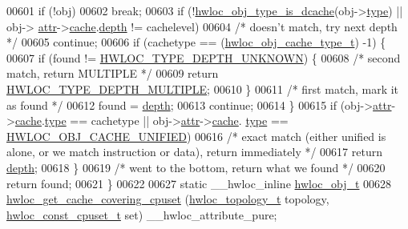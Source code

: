 \begin{DoxyCode}
00601     \textcolor{keywordflow}{if} (!obj)
00602       \textcolor{keywordflow}{break};
00603     \textcolor{keywordflow}{if} (!\hyperlink{a00198_ga395e48cd221d107e5891689624e1aec4}{hwloc\_obj\_type\_is\_dcache}(obj->\hyperlink{a00238_acc4f0803f244867e68fe0036800be5de}{type}) || obj->
      \hyperlink{a00238_accd40e29f71f19e88db62ea3df02adc8}{attr}->\hyperlink{a00242_ab5a8ae3bf490e6b1071fea53f7382836}{cache}.\hyperlink{a00254_a5c8f7f39193736c2187ed626940835d5}{depth} != cachelevel)
00604       \textcolor{comment}{/* doesn't match, try next depth */}
00605       \textcolor{keywordflow}{continue};
00606     \textcolor{keywordflow}{if} (cachetype == (\hyperlink{a00184_gab6e1e7efedae8b341f3ee14fbe53d66c}{hwloc\_obj\_cache\_type\_t}) -1) \{
00607       \textcolor{keywordflow}{if} (found != \hyperlink{a00187_ggaf4e663cf42bbe20756b849c6293ef575a0565ab92ab72cb0cec91e23003294aad}{HWLOC\_TYPE\_DEPTH\_UNKNOWN}) \{
00608         \textcolor{comment}{/* second match, return MULTIPLE */}
00609         \textcolor{keywordflow}{return} \hyperlink{a00187_ggaf4e663cf42bbe20756b849c6293ef575ae99465995cacde6c210d5fc2e409798c}{HWLOC\_TYPE\_DEPTH\_MULTIPLE};
00610       \}
00611       \textcolor{comment}{/* first match, mark it as found */}
00612       found = \hyperlink{a00238_a4876fd165b4fff35521f07ebd85355ed}{depth};
00613       \textcolor{keywordflow}{continue};
00614     \}
00615     \textcolor{keywordflow}{if} (obj->\hyperlink{a00238_accd40e29f71f19e88db62ea3df02adc8}{attr}->\hyperlink{a00242_ab5a8ae3bf490e6b1071fea53f7382836}{cache}.\hyperlink{a00254_ad8edc8ded2b7a70d6abbc874801930f4}{type} == cachetype || obj->\hyperlink{a00238_accd40e29f71f19e88db62ea3df02adc8}{attr}->\hyperlink{a00242_ab5a8ae3bf490e6b1071fea53f7382836}{cache}.
      \hyperlink{a00254_ad8edc8ded2b7a70d6abbc874801930f4}{type} == \hyperlink{a00184_gga791c9875c8fe20f3e1e5871e0657e59ba3900b3b2db54941aac249e5a638a2d7a}{HWLOC\_OBJ\_CACHE\_UNIFIED})
00616       \textcolor{comment}{/* exact match (either unified is alone, or we match instruction or data), return immediately */}
00617       \textcolor{keywordflow}{return} \hyperlink{a00238_a4876fd165b4fff35521f07ebd85355ed}{depth};
00618   \}
00619   \textcolor{comment}{/* went to the bottom, return what we found */}
00620   \textcolor{keywordflow}{return} found;
00621 \}
00622 
00627 \textcolor{keyword}{static} \_\_hwloc\_inline \hyperlink{a00238}{hwloc\_obj\_t}
00628 \hyperlink{a00199_gac4cd480a5deaa4ada047fdd11ae4c070}{hwloc\_get\_cache\_covering\_cpuset} (\hyperlink{a00186_ga9d1e76ee15a7dee158b786c30b6a6e38}{hwloc\_topology\_t} topology, 
      \hyperlink{a00183_ga1f784433e9b606261f62d1134f6a3b25}{hwloc\_const\_cpuset\_t} \textcolor{keyword}{set}) \_\_hwloc\_attribute\_pure;

\end{DoxyCode}
